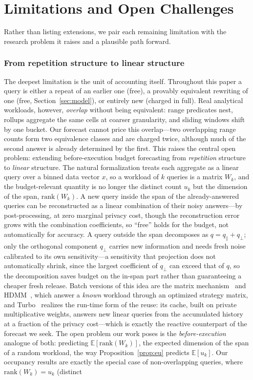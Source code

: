 \documentclass[sigconf,nonacm]{acmart}
\newcommand{\E}{\mathbb{E}}
\begin{document}
\section{Limitations and Open Challenges}
\label{sec:future}
Rather than listing extensions, we pair each remaining limitation with the research problem it raises and a plausible path forward.

\subsubsection*{From repetition structure to linear structure}
The deepest limitation is the unit of accounting itself. Throughout this paper a query is either a repeat of an earlier one (free), a provably equivalent rewriting of one (free, Section~\ref{sec:model}), or entirely new (charged in full). Real analytical workloads, however, \emph{overlap} without being equivalent: range predicates nest, rollups aggregate the same cells at coarser granularity, and sliding windows shift by one bucket. Our forecast cannot price this overlap---two overlapping range counts form two equivalence classes and are charged twice, although much of the second answer is already determined by the first. This raises the central open problem: extending before-execution budget forecasting from \emph{repetition} structure to \emph{linear} structure. The natural formalization treats each aggregate as a linear query over a binned data vector $x$, so a workload of $k$ queries is a matrix $W_k$, and the budget-relevant quantity is no longer the distinct count $u_k$ but the dimension of the span, $\mathrm{rank}(W_k)$. A new query inside the span of the already-answered queries can be reconstructed as a linear combination of their noisy answers---by post-processing, at zero marginal privacy cost, though the reconstruction error grows with the combination coefficients, so ``free'' holds for the budget, not automatically for accuracy. A query outside the span decomposes as $q = q_{\parallel} + q_{\perp}$; only the orthogonal component $q_{\perp}$ carries new information and needs fresh noise calibrated to its own sensitivity---a sensitivity that projection does not automatically shrink, since the largest coefficient of $q_{\perp}$ can exceed that of $q$, so the decomposition saves budget on the in-span part rather than guaranteeing a cheaper fresh release. Batch versions of this idea are the matrix mechanism~\cite{li2015matrix} and HDMM~\cite{mckenna2018hdmm}, which answer a \emph{known} workload through an optimized strategy matrix, and Turbo~\cite{kostopoulou2023turbo} realizes the run-time form of the reuse: its cache, built on private multiplicative weights, answers new linear queries from the accumulated history at a fraction of the privacy cost---which is exactly the reactive counterpart of the forecast we seek. The open problem our work poses is the \emph{before-execution} analogue of both: predicting $\E[\mathrm{rank}(W_k)]$, the expected dimension of the span of a random workload, the way Proposition~\ref{prop:eu} predicts $\E[u_k]$. Our occupancy results are exactly the special case of non-overlapping queries, where $\mathrm{rank}(W_k)=u_k$ (distinct 
\end{document}
